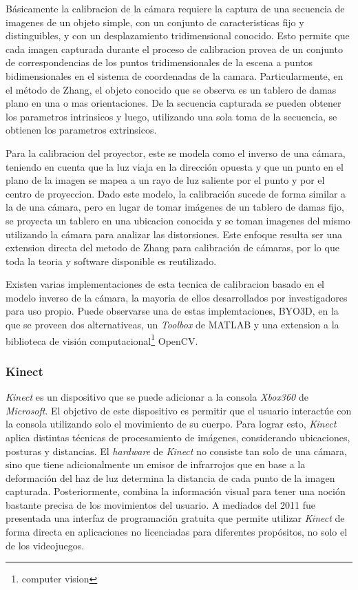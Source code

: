 Básicamente la calibracion de la cámara requiere la captura de una secuencia de imagenes de un objeto simple, con un conjunto de caracteristicas fijo y distinguibles, y con un desplazamiento tridimensional conocido. Esto permite que cada imagen capturada durante el proceso de calibracion provea de un conjunto de correspondencias de los puntos tridimensionales de la escena a puntos bidimensionales en el sistema de coordenadas de la camara. Particularmente, en el método de Zhang, el objeto conocido que se observa es un tablero de damas plano en una o mas orientaciones. De la secuencia capturada se pueden obtener los parametros intrinsicos y luego, utilizando una sola toma de la secuencia,  se obtienen los parametros extrinsicos.

Para la calibracion del proyector, este se modela como el inverso de una cámara, teniendo en cuenta que la luz viaja en la dirección opuesta y que un punto en el plano de la imagen se mapea a un rayo de luz saliente por el punto y por el centro de proyeccion. Dado este modelo, la calibración sucede de forma similar a la de una cámara, pero en lugar de tomar imágenes de un tablero de damas fijo, se proyecta un tablero en una ubicacion conocida y se toman imagenes del mismo utilizando la cámara para analizar las distorsiones. Este enfoque resulta ser una extension directa del metodo de Zhang para calibración de cámaras, por lo que toda la teoria y software disponible es reutilizado.

Existen varias implementaciones de esta tecnica de calibracion basado en el modelo inverso de la cámara, la mayoria de ellos desarrollados por investigadores para uso propio. Puede observarse una de estas implemtaciones, BYO3D\cite{BYO3D}, en la que se proveen dos alternativeas, un \emph{Toolbox} de MATLAB\cite{MATLAB} y una extension a la biblioteca de visión computacional\footnote{computer vision} OpenCV\cite{OpenCV}.

\subsubsection{Kinect}

\emph{Kinect} es un dispositivo que se puede adicionar a la consola \emph{Xbox360} de \emph{Microsoft}. El objetivo de este dispositivo es permitir que el usuario interactúe con la consola utilizando solo el movimiento de su cuerpo. Para lograr esto, \emph{Kinect} aplica distintas técnicas de procesamiento de imágenes, considerando ubicaciones, posturas y distancias. El \emph{hardware} de \emph{Kinect} no consiste tan solo de una cámara, sino que tiene adicionalmente un emisor de infrarrojos que en base a la deformación del haz de luz determina la distancia de cada punto de la imagen capturada. Posteriormente, combina la información visual para tener una noción bastante precisa de los movimientos del usuario. A mediados del 2011 fue presentada una interfaz de programación gratuita que permite utilizar \emph{Kinect} de forma directa en aplicaciones no licenciadas para diferentes propósitos, no solo el de los videojuegos.

